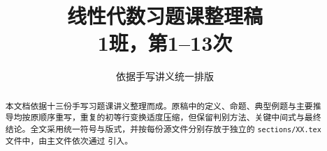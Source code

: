 \documentclass[UTF8,a4paper,11pt]{ctexart}
\title{线性代数习题课整理稿\\\large 1班，第1--13次}
\author{依据手写讲义统一排版}
\date{}
\numberwithin{equation}{section}
\theoremstyle{plain}
\theoremstyle{definition}
\theoremstyle{remark}
\begin{document}
\maketitle
\begin{abstract}
本文档依据十三份手写习题课讲义整理而成。原稿中的定义、命题、典型例题与主要推导均按原顺序重写，重复的初等行变换适度压缩，但保留判别方法、关键中间式与最终结论。全文采用统一符号与版式，并按每份源文件分别存放于独立的 \texttt{sections/XX.tex} 文件中，由主文件依次通过 \verb|| 引入。
\end{abstract}
\tableofcontents
\clearpage














\end{document}
